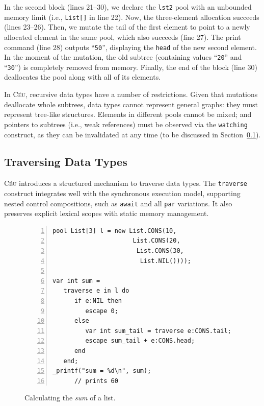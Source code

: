 \documentclass{acm_proc_article-sp}
\newcommand{\CEU}{\textsc{C\'{e}u}\xspace}
\newcommand{\code}[1] {{\small{\texttt{#1}}}}
\begin{document}
In the second block (lines 21--30), we declare the \code{lst2} pool with an
unbounded memory limit (i.e., \code{List[]} in line 22).
Now, the three-element allocation succeeds (lines 23--26).
Then, we mutate the tail of the first element to point to a newly allocated 
element in the same pool, which also succeeds (line 27).
The print command (line 28) outputs ``\texttt{50}'', displaying the \code{head}
of the new second element.
In the moment of the mutation, the old subtree (containing values  ``\texttt{20}''
and  ``\texttt{30}'') is completely removed from memory.
Finally, the end of the block (line 30) deallocates the pool along with all of 
its elements.


In \CEU, recursive data types have a number of restrictions.
Given that mutations deallocate whole subtrees, data types cannot represent 
general graphs: they must represent tree-like structures.
Elements in different pools cannot be mixed;
and pointers to subtrees (i.e., weak references) must be observed via the
\code{watching} construct, as they can be invalidated at any time
(to be discussed in Section~\ref{sec.traverse}).


\subsection{Traversing Data Types}
\label{sec.traverse}

\CEU introduces a structured mechanism to traverse data types.
The \code{traverse} construct integrates well with the synchronous execution 
model, supporting nested control compositions, such as \code{await} and all 
\code{par} variations.
It also preserves explicit lexical scopes with static memory management.

\begin{figure}%
\begin{lstlisting}[numbers=left,xleftmargin=3em]
pool List[3] l = new List.CONS(10,
                      List.CONS(20,
                       List.CONS(30,
                        List.NIL())));

var int sum =
   traverse e in l do
      if e:NIL then
         escape 0;
      else
         var int sum_tail = traverse e:CONS.tail;
         escape sum_tail + e:CONS.head;
      end
   end;
_printf("sum = %d\n", sum);
      // prints 60
\end{lstlisting}
\caption{
Calculating the \emph{sum} of a list.
\label{lst.list.sum}
}
\end{figure}
\end{document}
